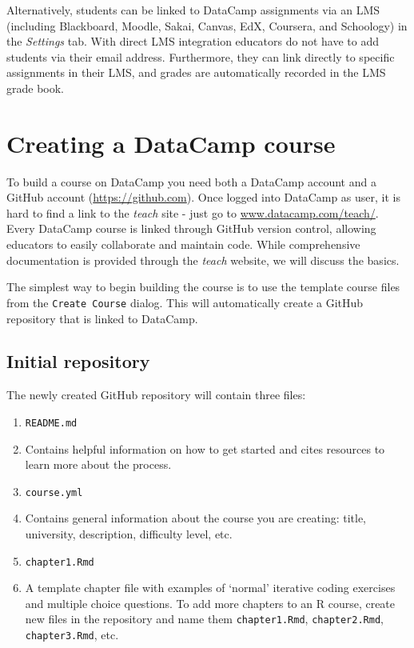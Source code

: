 \documentclass{tise_style_doi}
\begin{document}
Alternatively, students can be linked to DataCamp assignments via an LMS (including
Blackboard, Moodle, Sakai, Canvas, EdX, Coursera, and Schoology) in the \textit{Settings} tab.
With direct LMS integration educators do not have to add students via their email address.
Furthermore, they can link directly to specific assignments in their LMS, and grades are
automatically recorded in the LMS grade book.

\section{Creating a DataCamp course}
\label{creating}


To build a course on DataCamp you need both a DataCamp account and a GitHub account 
(\url{https://github.com}). Once logged into DataCamp as user, it is hard to find a link
to the \emph{teach} site - just go to \url{www.datacamp.com/teach/}.  
Every DataCamp course is linked through GitHub version control, allowing educators to 
easily collaborate and maintain code. While comprehensive documentation is provided 
through the \emph{teach} website, we will discuss the basics.

The simplest way to begin building the course is to use the template course files from
the \texttt{Create Course} dialog. This will automatically create a GitHub repository
that is linked to DataCamp.

\subsection{Initial repository}

The newly created GitHub repository will contain three files:
\begin{enumerate}
\item \texttt{README.md}
\item[] Contains helpful information on how to get started and cites resources to
learn more about the process.
\item \texttt{course.yml}
\item[] Contains general information about the course you are creating: title, university,
description, difficulty level, etc.
\item \texttt{chapter1.Rmd}
\item[] A template chapter file with examples of `normal' iterative coding exercises and
multiple choice questions.  To add more chapters to an R course, create new files in the repository
and name them \texttt{chapter1.Rmd}, \texttt{chapter2.Rmd}, \texttt{chapter3.Rmd}, etc.
\end{enumerate}
\end{document}
